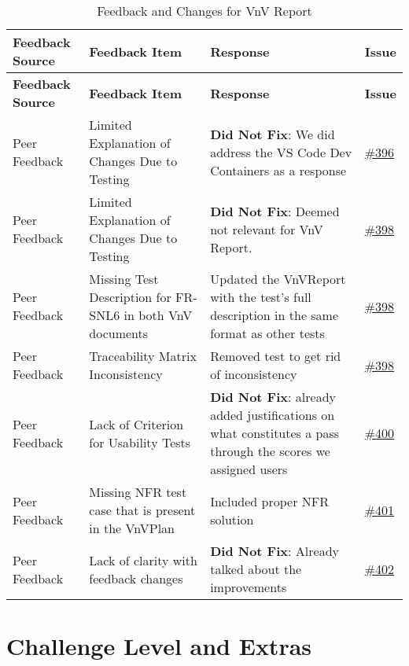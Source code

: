 \documentclass{article}
\begin{document}
\begin{longtable}{| p{} | p{} | p{} | p{} |}
    \caption{Feedback and Changes for VnV Report} \\
    \hline
    \textbf{Feedback Source} & \textbf{Feedback Item} & \textbf{Response} & \textbf{Issue} \\
    \hline
    \endfirsthead
    \hline
    \textbf{Feedback Source} & \textbf{Feedback Item} & \textbf{Response} & \textbf{Issue} \\
    \hline
    \endhead
    \hline
    \endfoot
    Peer Feedback & Limited Explanation of Changes Due to Testing & \textbf{Did Not Fix}: We did address the VS Code Dev Containers as a response & \href{https://github.com/TPGEngine/tpg/issues/396}{\#396} \\
    \hline
    Peer Feedback & Limited Explanation of Changes Due to Testing   & \textbf{Did Not Fix}: Deemed not relevant for VnV Report.  & \href{https://github.com/TPGEngine/tpg/issues/398}{\#398} \\
    \hline
    Peer Feedback & Missing Test Description for FR-SNL6 in both VnV documents  & Updated the VnVReport with the test's full description in the same format as other tests & \href{https://github.com/TPGEngine/tpg/issues/398}{\#398} \\
    \hline
    Peer Feedback & Traceability Matrix Inconsistency  & Removed test to get rid of inconsistency & \href{https://github.com/TPGEngine/tpg/issues/398}{\#398} \\
    \hline
    Peer Feedback & Lack of Criterion for Usability Tests & \textbf{Did Not Fix}: already added justifications on what constitutes a pass through the scores we assigned users  & \href{https://github.com/TPGEngine/tpg/issues/400}{\#400} \\
    \hline
    Peer Feedback & Missing NFR test case that is present in the VnVPlan & Included proper NFR solution & \href{https://github.com/TPGEngine/tpg/issues/401}{\#401} \\
    \hline
    Peer Feedback & Lack of clarity with feedback changes & \textbf{Did Not Fix}: Already talked about the improvements & \href{https://github.com/TPGEngine/tpg/issues/402}{\#402} \\
    \hline

\end{longtable}

\section{Challenge Level and Extras}
\end{document}
